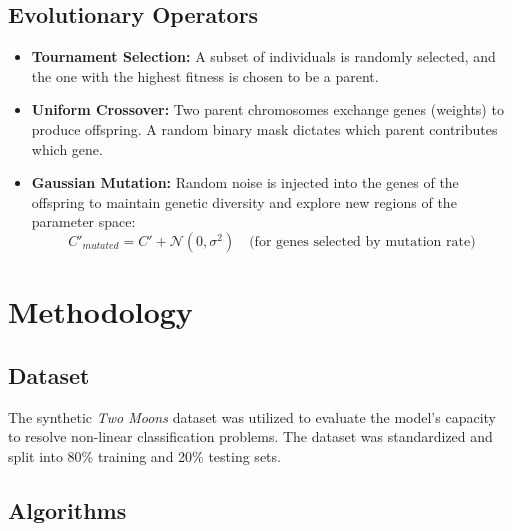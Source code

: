 \documentclass[11pt]{article}
\begin{document}
\subsection{Evolutionary Operators}
\begin{itemize}
    \item \textbf{Tournament Selection:} A subset of individuals is randomly selected, and the one with the highest fitness is chosen to be a parent.
    \item \textbf{Uniform Crossover:} Two parent chromosomes exchange genes (weights) to produce offspring. A random binary mask dictates which parent contributes which gene.
    \item \textbf{Gaussian Mutation:} Random noise is injected into the genes of the offspring to maintain genetic diversity and explore new regions of the parameter space:
          \begin{equation}
              C'_{mutated} = C' + \mathcal{N}(0, \sigma^2) \quad \text{(for genes selected by mutation rate)}
          \end{equation}
\end{itemize}

\section{Methodology}

\subsection{Dataset}
The synthetic \textit{Two Moons} dataset was utilized to evaluate the model's capacity to resolve non-linear classification problems. The dataset was standardized and split into 80\% training and 20\% testing sets.

\subsection{Algorithms}
\end{document}
